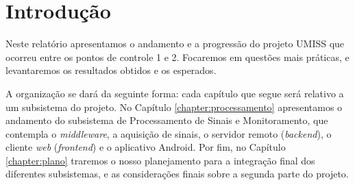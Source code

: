 \chapter{Introdução}

Neste relatório apresentamos o andamento e a progressão do projeto UMISS que
ocorreu entre os pontos de controle 1 e 2. Focaremos em questões mais práticas,
e levantaremos os resultados obtidos e os esperados.

A organização se dará da seguinte forma: cada capítulo que segue será relativo
a um subsistema do projeto. No Capítulo \ref{chapter:processamento}
apresentamos o andamento do subsistema de Processamento de Sinais e
Monitoramento, que contempla o \textit{middleware}, a aquisição de sinais, o
servidor remoto (\textit{backend}), o cliente \textit{web} (\textit{frontend})
e o aplicativo Android. Por fim, no Capítulo \ref{chapter:plano} traremos o
nosso planejamento para a integração final dos diferentes subsistemas, e
as considerações finais sobre a segunda parte do projeto.
